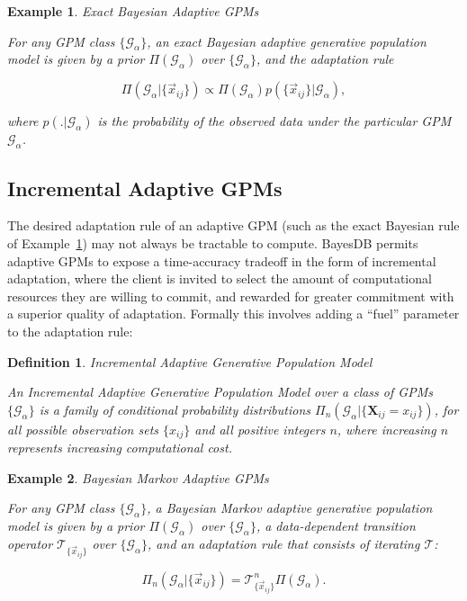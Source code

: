 \documentclass[10pt,letterpaper]{article}
\newtheorem{example}{Example}[section]
\newtheorem{definition}{Definition}[section]
\newcommand{\G}{\mathcal{G}}
\newcommand{\T}{\mathcal{T}}
\begin{document}
\begin{example} Exact Bayesian Adaptive GPMs

For any GPM class $\{\G_\alpha\}$, an \emph{exact Bayesian adaptive
  generative population model} is given by a prior
$\Pi(\G_\alpha)$ over
$\{\G_\alpha\}$, and the adaptation rule

\[ \Pi(\G_\alpha|\{\vec{x}_{ij}\}) \propto \Pi(\G_\alpha) p(\{\vec{x}_{ij}\}|\G_\alpha), \]

where $p(.|\G_\alpha)$ is the probability of the observed data under
the particular GPM $\G_\alpha$. \label{ex:exact-bayes}
\end{example}

\subsection{Incremental Adaptive GPMs}

The desired adaptation rule of an adaptive GPM (such as the exact
Bayesian rule of Example~\ref{ex:exact-bayes}) may not always be
tractable to compute.  BayesDB permits adaptive GPMs to expose a
time-accuracy tradeoff in the form of incremental adaptation, where
the client is invited to select the amount of computational resources
they are willing to commit, and rewarded for greater commitment with a
superior quality of adaptation.  Formally this involves adding a ``fuel''
parameter to the adaptation rule:

\begin{definition} Incremental Adaptive Generative Population Model

An \emph{Incremental Adaptive Generative Population Model} over a class of GPMs
$\{\G_\alpha\}$ is a family of conditional probability distributions
$\Pi_n(\G_\alpha|\{\mathbf{X}_{ij} = x_{ij}\})$, for all possible
observation sets $\{x_{ij}\}$ and all positive integers $n$, where increasing
$n$ represents increasing computational cost.
\end{definition}

\begin{example} Bayesian Markov Adaptive GPMs

For any GPM class $\{\G_\alpha\}$, a \emph{Bayesian Markov adaptive
  generative population model} is given by a prior
$\Pi(\G_\alpha)$ over
$\{\G_\alpha\}$, a data-dependent transition operator
$\T_{\{\vec{x}_{ij}\}}$ over $\{\G_\alpha\}$, and
an adaptation rule that consists of iterating $\T$:

\[ \Pi_n(\G_\alpha|\{\vec{x}_{ij}\}) = \T_{\{\vec{x}_{ij}\}}^n \Pi(\G_\alpha). \]
\label{ex:markov-bayes}
\end{example}
\end{document}
